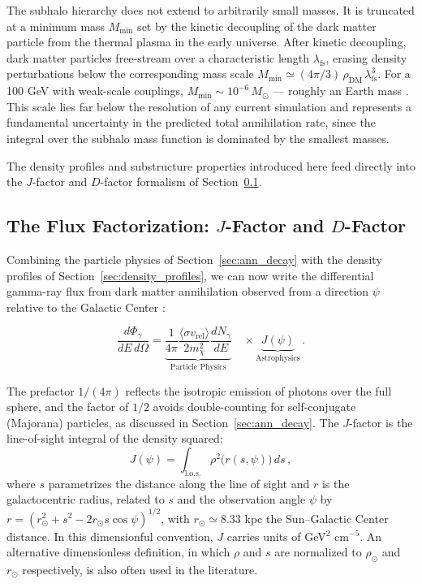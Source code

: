 The subhalo hierarchy does not extend to arbitrarily small masses.
It is truncated at a minimum mass $M_\text{min}$ set by the kinetic decoupling of the dark matter particle from the thermal plasma in the early universe.
After kinetic decoupling, dark matter particles free-stream over a characteristic length $\lambda_\text{fs}$, erasing density perturbations below the corresponding mass scale $M_\text{min} \simeq (4\pi/3)\, \rho_\text{DM}\, \lambda_\text{fs}^3$.
For a 100 GeV \WIMP with weak-scale couplings, $M_\text{min} \sim 10^{-6}\, M_\odot$ --- roughly an Earth mass \cite{Cirelli:2024ssz}.
This scale lies far below the resolution of any current simulation and represents a fundamental uncertainty in the predicted total annihilation rate, since the integral over the subhalo mass function is dominated by the smallest masses.

The density profiles and substructure properties introduced here feed directly into the $J$-factor and $D$-factor formalism of Section~\ref{sec:jfactor}.

\subsection{The Flux Factorization: $J$-Factor and $D$-Factor}
\label{sec:jfactor}

Combining the particle physics of Section~\ref{sec:ann_decay} with the density profiles of Section~\ref{sec:density_profiles}, we can now write the differential gamma-ray flux from dark matter annihilation observed from a direction $\psi$ relative to the Galactic Center \cite{Cirelli:2024ssz}:

\begin{equation}
	\frac{d\Phi_\gamma}{dE\, d\Omega} = \underbrace{\frac{1}{4\pi} \frac{\langle \sigma v_\text{rel} \rangle}{2 m_\chi^2} \frac{dN_\gamma}{dE}}_{\text{Particle Physics}} \quad \times \underbrace{J(\psi)}_{\text{Astrophysics}} \,.
	\label{eq:flux_ann}
\end{equation}

The prefactor $1/(4\pi)$ reflects the isotropic emission of photons over the full sphere, and the factor of $1/2$ avoids double-counting for self-conjugate (Majorana) particles, as discussed in Section~\ref{sec:ann_decay}.
The $J$-factor is the line-of-sight integral of the density squared:
%
\begin{equation}
	J(\psi) = \int_\text{l.o.s.} \rho^2\bigl(r(s, \psi)\bigr) \, ds \,,
	\label{eq:jfactor}
\end{equation}
%
where $s$ parametrizes the distance along the line of sight and $r$ is the galactocentric radius, related to $s$ and the observation angle $\psi$ by $r = (r_\odot^2 + s^2 - 2 r_\odot s \cos\psi)^{1/2}$, with $r_\odot \simeq 8.33$ kpc the Sun--Galactic Center distance.
In this dimensionful convention, $J$ carries units of GeV$^2$ cm$^{-5}$.
An alternative dimensionless definition, in which $\rho$ and $s$ are normalized to $\rho_\odot$ and $r_\odot$ respectively, is also often used in the literature.

